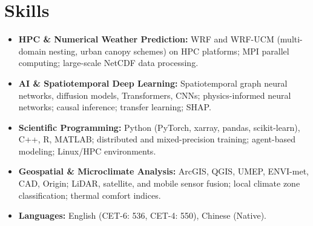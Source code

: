 \documentclass[10pt,a4paper]{article}
\newcommand{\cvitembf}[2]{\item \textbf{#1:} #2}
\begin{document}
\section{Skills}

\begin{itemize}[leftmargin=22pt]
    \cvitembf{HPC \& Numerical Weather Prediction}{WRF and WRF-UCM (multi-domain nesting, urban canopy schemes) on HPC platforms; MPI parallel computing; large-scale NetCDF data processing.}

    \cvitembf{AI \& Spatiotemporal Deep Learning}{Spatiotemporal graph neural networks, diffusion models, Transformers, CNNs; physics-informed neural networks; causal inference; transfer learning; SHAP.}

    \cvitembf{Scientific Programming}{Python (PyTorch, xarray, pandas, scikit-learn), C++, R, MATLAB; distributed and mixed-precision training; agent-based modeling; Linux/HPC environments.}

    \cvitembf{Geospatial \& Microclimate Analysis}{ArcGIS, QGIS, UMEP, ENVI-met, CAD, Origin; LiDAR, satellite, and mobile sensor fusion; local climate zone classification; thermal comfort indices.}

    \cvitembf{Languages}{English (CET-6: 536, CET-4: 550), Chinese (Native).}
\end{itemize}
\end{document}
